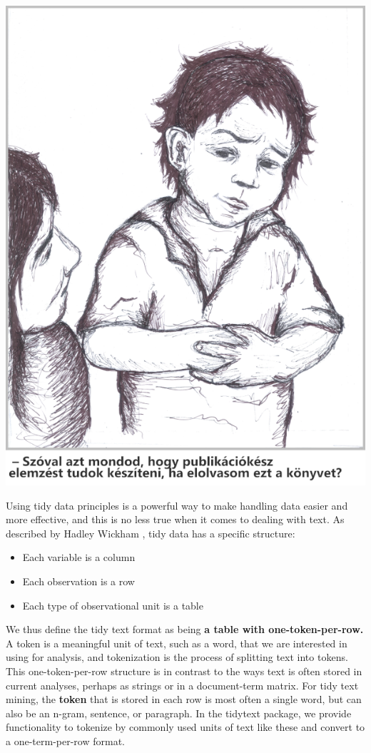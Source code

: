 \documentclass[
]{book}
\providecommand{\tightlist}{%
  \setlength{\itemsep}{0pt}\setlength{\parskip}{0pt}}
\begin{document}
\begin{center}\includegraphics[width=0.9\linewidth]{images/ch_01_small} \end{center}

Using tidy data principles is a powerful way to make handling data easier and more effective, and this is no less true when it comes to dealing with text. As described by Hadley Wickham \citep{tidydata}, tidy data has a specific structure:

\begin{itemize}
\tightlist
\item
  Each variable is a column
\item
  Each observation is a row
\item
  Each type of observational unit is a table
\end{itemize}

We thus define the tidy text format as being \textbf{a table with one-token-per-row.} A token is a meaningful unit of text, such as a word, that we are interested in using for analysis, and tokenization is the process of splitting text into tokens. This one-token-per-row structure is in contrast to the ways text is often stored in current analyses, perhaps as strings or in a document-term matrix. For tidy text mining, the \textbf{token} that is stored in each row is most often a single word, but can also be an n-gram, sentence, or paragraph. In the tidytext package, we provide functionality to tokenize by commonly used units of text like these and convert to a one-term-per-row format.
\end{document}
